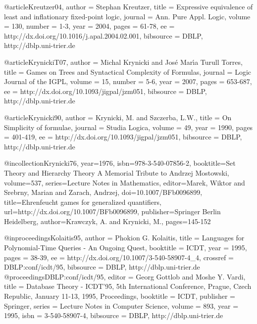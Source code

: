 \documentclass{article}
\begin{document}
@article{Kreutzer04,
  author    = {Stephan Kreutzer},
  title     = {Expressive equivalence of least and inflationary fixed-point
               logic},
  journal   = {Ann. Pure Appl. Logic},
  volume    = {130},
  number    = {1-3},
  year      = {2004},
  pages     = {61-78},
  ee        = {http://dx.doi.org/10.1016/j.apal.2004.02.001},
  bibsource = {DBLP, http://dblp.uni-trier.de}
}

@article{KrynickiT07,
  author    = {Michal Krynicki and
               Jos{\'e} Mar{\'{\i}}a {Turull Torres}},
  title     = {Games on Trees and Syntactical Complexity of Formulas},
  journal   = {Logic Journal of the IGPL},
  volume    = {15},
  number    = {5-6},
  year      = {2007},
  pages     = {653-687},
  ee        = {http://dx.doi.org/10.1093/jigpal/jzm051},
  bibsource = {DBLP, http://dblp.uni-trier.de}
}

@article{Krynicki90,
  author    = {Krynicki, M. and Szczerba, L.W.},
  title     = {On Simplicity of formulae},
  journal   = {Studia Logica},
  volume    = {49},
  year      = {1990},
  pages     = {401-419},
  ee        = {http://dx.doi.org/10.1093/jigpal/jzm051},
  bibsource = {DBLP, http://dblp.uni-trier.de}
}

@incollection{Krynicki76,
year={1976},
isbn={978-3-540-07856-2},
booktitle={Set Theory and Hierarchy Theory A Memorial Tribute to Andrzej Mostowski},
volume={537},
series={Lecture Notes in Mathematics},
editor={Marek, Wiktor and Srebrny, Marian and Zarach, Andrzej},
doi={10.1007/BFb0096899},
title={{Ehrenfeucht} games for generalized quantifiers},
url={http://dx.doi.org/10.1007/BFb0096899},
publisher={Springer Berlin Heidelberg},
author={Krawczyk, A. and Krynicki, M.},
pages={145-152}
}


@inproceedings{Kolaitis95,
  author    = {Phokion G. Kolaitis},
  title     = {Languages for Polynomial-Time Queries - An Ongoing Quest},
  booktitle = {ICDT},
  year      = {1995},
  pages     = {38-39},
  ee        = {http://dx.doi.org/10.1007/3-540-58907-4_4},
  crossref  = {DBLP:conf/icdt/95},
  bibsource = {DBLP, http://dblp.uni-trier.de}
}
@proceedings{DBLP:conf/icdt/95,
  editor    = {Georg Gottlob and
               Moshe Y. Vardi},
  title     = {Database Theory - ICDT'95, 5th International Conference,
               Prague, Czech Republic, January 11-13, 1995, Proceedings},
  booktitle = {ICDT},
  publisher = {Springer},
  series    = {Lecture Notes in Computer Science},
  volume    = {893},
  year      = {1995},
  isbn      = {3-540-58907-4},
  bibsource = {DBLP, http://dblp.uni-trier.de}
}
\end{document}
